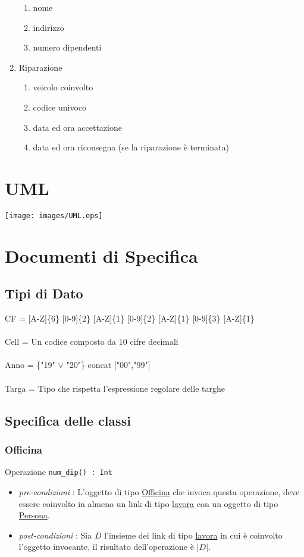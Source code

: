\documentclass[12pt, letterpaper]{article}
\newcommand{\acc}{\\\hphantom{}\\}
\newcommand{\code}[1]{\colorbox{light-gray}{\texttt{#1}}}
\begin{document}
\begin{enumerate}
\begin{enumerate}
              \item nome
              \item indirizzo
              \item numero dipendenti
          \end{enumerate}
    \item Riparazione\begin{enumerate}
              \item veicolo coinvolto
              \item codice univoco
              \item data ed ora accettazione
              \item data ed ora riconsegna (se la riparazione è terminata)
          \end{enumerate}
\end{enumerate}
\newpage
\section{UML}
\begin{center}
    \texttt{[image: images/UML.eps]}
\end{center}
\newpage
\section{Documenti di Specifica}
\subsection{Tipi di Dato}
CF = [A-Z]\{6\} [0-9]\{2\} [A-Z]\{1\} [0-9]\{2\} [A-Z]\{1\} [0-9]\{3\} [A-Z]\{1\}\acc
Cell = Un codice composto da 10 cifre decimali\acc
Anno = \{"19" $\lor$ "20"\} concat ["00","99"]\acc
Targa = Tipo che rispetta l'espressione regolare delle targhe
\subsection{Specifica delle classi}
\subsubsection{Officina}
Operazione \code{num\_dip() : Int}\begin{itemize}
    \item \textit{pre-condizioni} : L'oggetto di tipo \underline{Officina} che
          invoca questa operazione, deve essere coinvolto in almeno un link di tipo
          \underline{lavora} con un oggetto di tipo \underline{Persona}.
    \item \textit{post-condizioni} : Sia $D$ l'insieme dei link di tipo
          \underline{lavora} in cui è coinvolto l'oggetto invocante, il risultato
          dell'operazione è $|D|$.
\end{itemize}
\end{document}
